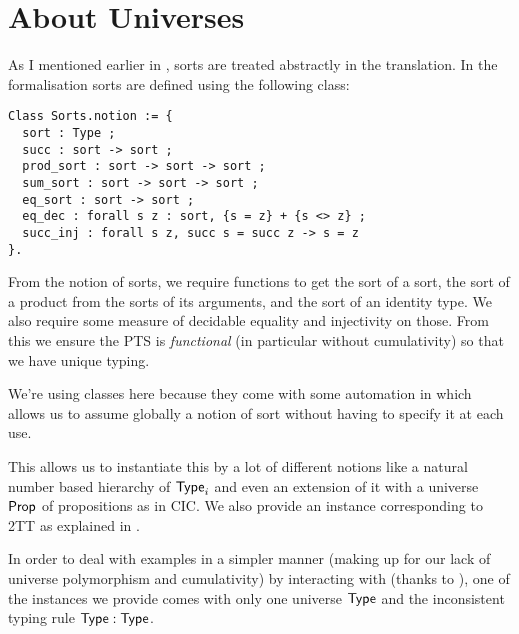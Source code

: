 

\section{About Universes}

As I mentioned earlier in , sorts are treated
abstractly in the translation. In the formalisation sorts are defined using
the following class:
%
\begin{verbatim}
Class Sorts.notion := {
  sort : Type ;
  succ : sort -> sort ;
  prod_sort : sort -> sort -> sort ;
  sum_sort : sort -> sort -> sort ;
  eq_sort : sort -> sort ;
  eq_dec : forall s z : sort, {s = z} + {s <> z} ;
  succ_inj : forall s z, succ s = succ z -> s = z
}.
\end{verbatim}
%
From the notion of sorts, we require functions to get the sort of a sort,
the sort of a product from the sorts of its arguments, and the sort of an
identity type.
We also require some measure of decidable equality and injectivity on those.
From this we ensure the \acrshort{PTS} is \emph{functional} (in particular
without cumulativity) so that we have unique typing.

We're using classes here because they come with some automation in \Coq which
allows us to assume globally a notion of sort without having to specify it at
each use.

This allows us to instantiate this by a lot of different notions like a natural
number based hierarchy of \(\mathsf{Type}_i\) and even an extension of it with a
universe $\mathsf{Prop}$ of propositions as in \acrshort{CIC}.
We also provide an instance corresponding to \acrshort{2TT} as explained in
.

In order to deal with examples in a simpler manner (making up for our lack of
universe polymorphism and cumulativity) by interacting with \Coq (thanks to
\MetaCoq), one of the instances we provide comes with only one universe $\mathsf{Type}$
and the inconsistent typing rule $\mathsf{Type} : \mathsf{Type}$.

